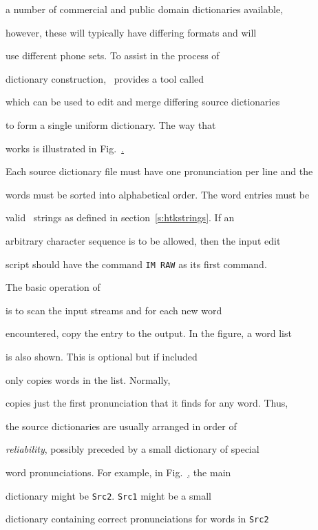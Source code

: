 a number of commercial and public domain dictionaries available,


however, these will typically have differing formats and will


use different phone sets.  To assist in the process of


dictionary construction, \HTK\ provides a tool called 


which can be used to edit and merge differing source dictionaries


to form a single uniform dictionary.  The way that


 works is illustrated in Fig.~\href{f:dmaker}.





Each source dictionary file must have one pronunciation per line and the


words must be sorted into alphabetical order.  The word entries must be


valid \HTK\ strings as defined in section~\ref{s:htkstrings}.  If an


arbitrary character sequence is to be allowed, then the input edit


script should have the command \texttt{IM RAW} as its first command.





The basic operation of 


 is to scan the input streams and for each new word


encountered, copy the entry to the output.  In the figure,  a word list


is also shown.  This is optional but if included 


 only copies words in the list.  Normally, 


copies just the first pronunciation that it finds for any word. Thus,


the source dictionaries are usually arranged in order of


\textit{reliability}, possibly preceded by a small dictionary of special


word pronunciations. For example, in Fig.~\href{f:dmaker}, the main


dictionary might be \texttt{Src2}.  \texttt{Src1} might be a small 


dictionary containing correct pronunciations for words in \texttt{Src2}


